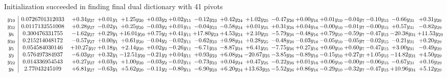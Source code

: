 \documentclass[9pt]{article}
\begin{document}
Initialization succeeded in finding final dual dictionary with 41 pivots
\[\begin{array}{c| c c@{\hskip 2pt} c@{\hskip 2pt} c@{\hskip 2pt} c@{\hskip 2pt} c@{\hskip 2pt} c@{\hskip 2pt} c@{\hskip 2pt} c@{\hskip 2pt} c@{\hskip 2pt} c@{\hskip 2pt} c@{\hskip 2pt} c@{\hskip 2pt} c@{\hskip 2pt} c@{\hskip 2pt} c@{\hskip 2pt} }
 y_{19}   &  0.0726701312033 & +  0.34 y_{27} & +  0.01 y_{1} & +  1.25 y_{20} & +  0.03 y_{2} & +  0.02 y_{11} & -0.12 y_{23} & +  0.42 y_{24} & +  1.02 y_{25} & -0.47 y_{26} & +  0.00 y_{16} & +  0.01 y_{10} & -0.04 y_{7} & -0.10 y_{15} & -0.66 y_{31} & +  0.31 y_{29}\\
 y_{32}   &  0.0117132551008 & +  0.28 y_{27} & -0.02 y_{1} & +  0.25 y_{20} & -0.03 y_{2} & +  0.01 y_{11} & -0.04 y_{23} & -0.58 y_{24} & +  0.01 y_{25} & +  0.31 y_{26} & +  0.04 y_{16} & -0.00 y_{10} & -0.01 y_{7} & -0.00 y_{15} & +  0.57 y_{31} & -0.82 y_{29}\\
 y_{6}   &  0.300476331755 & -1.62 y_{27} & +  0.29 y_{1} & + 16.01 y_{20} & +  0.75 y_{2} & +  0.41 y_{11} & + 17.80 y_{23} & +  4.53 y_{24} & +  2.10 y_{25} & -5.79 y_{26} & -0.48 y_{16} & +  0.79 y_{10} & -0.59 y_{7} & -0.47 y_{15} & -20.38 y_{31} & + 11.53 y_{29}\\
 y_{30}   &  0.215214048172 & -0.57 y_{27} & +  0.00 y_{1} & +  0.61 y_{20} & -0.04 y_{2} & -0.02 y_{11} & -0.62 y_{23} & +  0.98 y_{24} & +  0.28 y_{25} & -0.48 y_{26} & -0.03 y_{16} & -0.05 y_{10} & -0.05 y_{7} & -0.02 y_{15} & -0.21 y_{31} & +  0.20 y_{29}\\
 y_{5}   &  0.054584030146 & + 10.27 y_{27} & +  0.18 y_{1} & +  2.14 y_{20} & +  0.02 y_{2} & -0.26 y_{11} & -6.71 y_{23} & -8.87 y_{24} & +  6.41 y_{25} & -7.75 y_{26} & +  0.27 y_{16} & +  0.60 y_{10} & +  0.60 y_{7} & -0.47 y_{15} & +  3.00 y_{31} & -0.49 y_{29}\\
 y_{3}   &  0.576497384937 & -6.03 y_{27} & +  0.32 y_{1} & -12.51 y_{20} & -0.21 y_{2} & +  0.04 y_{11} & +  0.93 y_{23} & +  6.08 y_{24} & -20.67 y_{25} & -3.85 y_{26} & -0.89 y_{16} & -0.15 y_{10} & +  0.27 y_{7} & +  1.05 y_{15} & -14.82 y_{31} & +  4.50 y_{29}\\
 y_{22}   &  0.014336954543 & +  0.27 y_{27} & +  0.03 y_{1} & +  1.00 y_{20} & -0.03 y_{2} & -0.02 y_{11} & -0.73 y_{23} & +  0.04 y_{24} & +  0.47 y_{25} & -0.22 y_{26} & +  0.01 y_{16} & +  0.06 y_{10} & -0.00 y_{7} & -0.06 y_{15} & -0.67 y_{31} & +  0.16 y_{29}\\
 y_{8}   &  2.77043245109 & +  6.81 y_{27} & -0.63 y_{1} & +  5.62 y_{20} & -0.11 y_{2} & -0.80 y_{11} & -6.90 y_{23} & +  6.20 y_{24} & + 13.63 y_{25} & -5.52 y_{26} & +  0.86 y_{16} & -0.29 y_{10} & -0.32 y_{7} & -0.47 y_{15} & + 10.96 y_{31} & +  5.12 y_{29}\\

\end{array}\]
\end{document}
